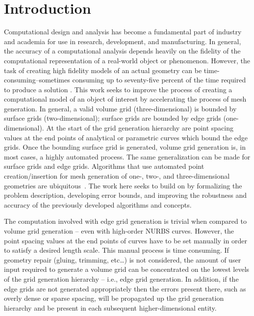 \section{Introduction}
Computational design and analysis has become a fundamental part of industry
and academia for use in research, development, and manufacturing. In general,
the accuracy of a computational analysis depends heavily on the fidelity of
the computational representation of a real-world object or phenomenon. However,
the task of creating high fidelity models of an actual geometry can be
time-consuming--sometimes consuming up to seventy-five percent of the time
required to produce a solution \cite{bischoff05}. This work seeks to improve
the process of creating a computational model of an object of interest by
accelerating the process of mesh generation. In general, a valid volume grid
(three-dimensional) is bounded by surface grids (two-dimensional); surface
grids are bounded by edge grids (one-dimensional). At the start of the grid
generation hierarchy are point spacing values at the end points of analytical
or parametric curves which bound the edge grids. Once the bounding surface
grid is generated, volume grid generation is, in most cases, a highly automated
process. The same generalization can be made for surface grids and edge grids.
Algorithms that use automated point creation/insertion for mesh generation of
one-, two-, and three-dimensional geometries are
ubiquitous~\cite{cubit,delaunay,aflr}.  The work here seeks to build on
\cite{mclaurin12} by formalizing the problem description, developing error
bounds, and improving the robustness and accuracy of the previously developed
algorithms and concepts.

The computation involved with edge grid generation is trivial when 
compared to volume grid generation -- even with high-order NURBS curves. 
However, the point spacing values at the end points of curves have to be 
set manually in order to satisfy a desired length scale. This manual 
process is time consuming. If geometry repair (gluing, trimming, etc…) is 
not considered, the amount of user input required to generate a volume 
grid can be concentrated on the lowest levels of the grid generation 
hierarchy -- i.e., edge grid generation. In addition, if the edge grids 
are not generated appropriately then the errors present there, such as 
overly dense or sparse spacing, will be propagated up the grid generation hierarchy and be present in each subsequent higher-dimensional entity.

